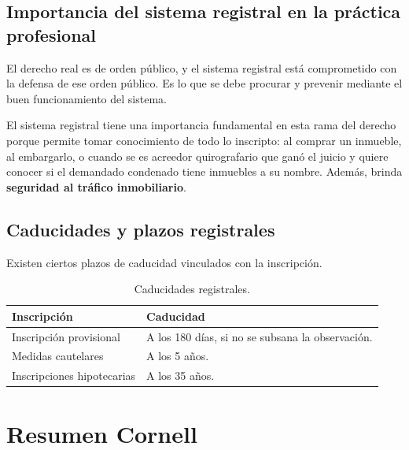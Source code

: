 \documentclass[12pt,oneside]{book}
\begin{document}
\section{Importancia del sistema registral en la práctica profesional}

El derecho real es de orden público, y el sistema registral está comprometido con la defensa de ese orden público. Es lo que se debe procurar y prevenir mediante el buen funcionamiento del sistema.

El sistema registral tiene una importancia fundamental en esta rama del derecho porque permite tomar conocimiento de todo lo inscripto: al comprar un inmueble, al embargarlo, o cuando se es acreedor quirografario que ganó el juicio y quiere conocer si el demandado condenado tiene inmuebles a su nombre. Además, brinda \textbf{seguridad al tráfico inmobiliario}.

\section{Caducidades y plazos registrales}

Existen ciertos plazos de caducidad vinculados con la inscripción.

\begin{table}[H]
\centering
\begin{tabularx}{\textwidth}{>{\raggedright\arraybackslash}p{}>{\raggedright\arraybackslash}X}
\toprule
\textbf{Inscripción} & \textbf{Caducidad} \\
\midrule
Inscripción provisional & A los 180 días, si no se subsana la observación. \\
Medidas cautelares & A los 5 años. \\
Inscripciones hipotecarias & A los 35 años. \\
\bottomrule
\end{tabularx}
\caption{Caducidades registrales.}
\end{table}

\chapter{Resumen Cornell}
\end{document}
